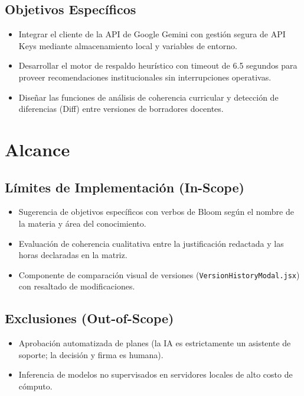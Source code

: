 \documentclass[12pt,a4paper]{article}
\begin{document}
\subsection{Objetivos Específicos}
\begin{itemize}[leftmargin=1.5em, itemsep=1.5pt]
    \item Integrar el cliente de la API de Google Gemini con gestión segura de API Keys mediante almacenamiento local y variables de entorno.
    \item Desarrollar el motor de respaldo heurístico con timeout de 6.5 segundos para proveer recomendaciones institucionales sin interrupciones operativas.
    \item Diseñar las funciones de análisis de coherencia curricular y detección de diferencias (Diff) entre versiones de borradores docentes.
\end{itemize}

\section{Alcance}

\subsection{Límites de Implementación (In-Scope)}
\begin{itemize}[leftmargin=1.5em, itemsep=1.5pt]
    \item Sugerencia de objetivos específicos con verbos de Bloom según el nombre de la materia y área del conocimiento.
    \item Evaluación de coherencia cualitativa entre la justificación redactada y las horas declaradas en la matriz.
    \item Componente de comparación visual de versiones (\texttt{VersionHistoryModal.jsx}) con resaltado de modificaciones.
\end{itemize}

\subsection{Exclusiones (Out-of-Scope)}
\begin{itemize}[leftmargin=1.5em, itemsep=1.5pt]
    \item Aprobación automatizada de planes (la IA es estrictamente un asistente de soporte; la decisión y firma es humana).
    \item Inferencia de modelos no supervisados en servidores locales de alto costo de cómputo.
\end{itemize}
\end{document}

